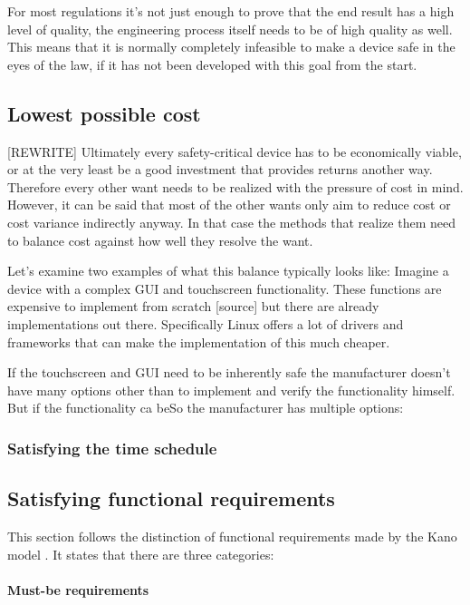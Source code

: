For most regulations it’s not just enough to prove that the end result has a high level of quality, the engineering process itself needs to be of high quality as well. This means that it is normally completely infeasible to make a device safe in the eyes of the law, if it has not been developed with this goal from the start.

\subsection{Lowest possible cost}
[REWRITE]
Ultimately every safety-critical device has to be economically viable, or at the very least be a good investment that provides returns another way. 
Therefore every other want needs to be realized with the pressure of cost in mind. However, it can be said that most of the other wants only aim to reduce cost or cost variance indirectly anyway. In that case the methods that realize them need to balance cost against how well they resolve the want.

Let’s examine two examples of what this balance typically looks like: Imagine a device with a complex GUI and touchscreen functionality. These functions are expensive to implement from scratch [source] but there are already implementations out there. Specifically Linux offers a lot of drivers and frameworks that can make the implementation of this much cheaper. 

If the touchscreen and GUI need to be inherently safe the manufacturer doesn't have many options other than to implement and verify the functionality himself. But if the functionality ca beSo the manufacturer has multiple options:   

\subsubsection{Satisfying the time schedule}
\subsection{Satisfying functional requirements}
This section follows the distinction of functional requirements made by the  Kano model \autocite{KanoNoriaki.1984}. 
It states that there are three categories: 
\paragraph{Must-be requirements}  \autocite{ElmarSauerwein.1996}

